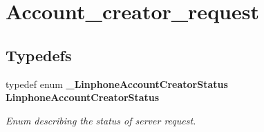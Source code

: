 \section{Account\+\_\+creator\+\_\+request}
\label{group__account__creator__request}
\subsection*{Typedefs}
\begin{DoxyCompactItemize}
\item 
\mbox{\label{group__account__creator__request_ga48d937b2f5157737a3ca24f20e6459bc}} 
typedef enum \textbf{ \+\_\+\+Linphone\+Account\+Creator\+Status} \textbf{ Linphone\+Account\+Creator\+Status}
\begin{DoxyCompactList}\small\item\em Enum describing the status of server request. \end{DoxyCompactList}\end{DoxyCompactItemize}
